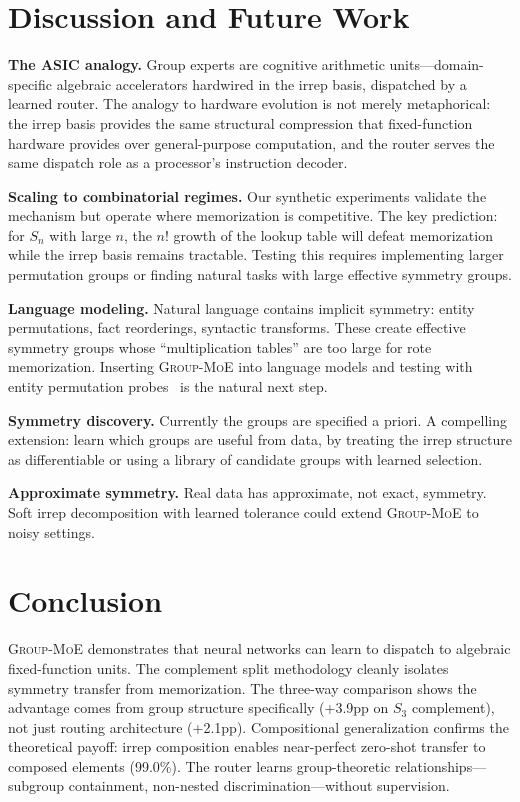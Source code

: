 \documentclass[10pt, letterpaper]{article}
\newcommand{\gmoe}{\textsc{Group-MoE}}
\begin{document}
\section{Discussion and Future Work}
\label{sec:discussion}

\textbf{The ASIC analogy.} Group experts are cognitive arithmetic units---domain-specific algebraic accelerators hardwired in the irrep basis, dispatched by a learned router. The analogy to hardware evolution is not merely metaphorical: the irrep basis provides the same structural compression that fixed-function hardware provides over general-purpose computation, and the router serves the same dispatch role as a processor's instruction decoder.

\textbf{Scaling to combinatorial regimes.} Our synthetic experiments validate the mechanism but operate where memorization is competitive. The key prediction: for $S_n$ with large $n$, the $n!$ growth of the lookup table will defeat memorization while the irrep basis remains tractable. Testing this requires implementing larger permutation groups or finding natural tasks with large effective symmetry groups.

\textbf{Language modeling.} Natural language contains implicit symmetry: entity permutations, fact reorderings, syntactic transforms. These create effective symmetry groups whose ``multiplication tables'' are too large for rote memorization. Inserting \gmoe{} into language models and testing with entity permutation probes~\cite{walters2025ordering} is the natural next step.

\textbf{Symmetry discovery.} Currently the groups are specified a priori. A compelling extension: learn which groups are useful from data, by treating the irrep structure as differentiable or using a library of candidate groups with learned selection.

\textbf{Approximate symmetry.} Real data has approximate, not exact, symmetry. Soft irrep decomposition with learned tolerance could extend \gmoe{} to noisy settings.

\section{Conclusion}
\label{sec:conclusion}

\gmoe{} demonstrates that neural networks can learn to dispatch to algebraic fixed-function units. The complement split methodology cleanly isolates symmetry transfer from memorization. The three-way comparison shows the advantage comes from group structure specifically (+3.9pp on $S_3$ complement), not just routing architecture (+2.1pp). Compositional generalization confirms the theoretical payoff: irrep composition enables near-perfect zero-shot transfer to composed elements (99.0\%). The router learns group-theoretic relationships---subgroup containment, non-nested discrimination---without supervision.
\end{document}
